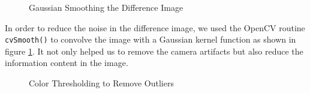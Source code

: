 \begin{figure}[ht!]
\centering
{} \quad
{} \hfill
\caption{Gaussian Smoothing the Difference Image}
\label{figure:gauss}
\end{figure}

In order to reduce the noise in the difference image, we used the OpenCV
routine \texttt{cvSmooth()} to convolve the image with a Gaussian kernel
function as shown in figure \ref{figure:gauss}. It not only helped us to
remove the camera artifacts but also reduce the information content in the
image.

\begin{figure}[ht!]
\centering
{} \quad
{} \hfill
\caption{Color Thresholding to Remove Outliers}
\label{figure:color-thres}
\end{figure}

